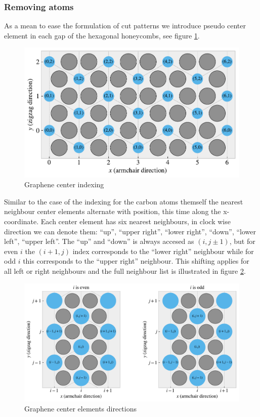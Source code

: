 \subsubsection{Removing atoms}

As a mean to ease the formulation of cut patterns we introduce pseudo center
element in each gap of the hexagonal honeycombs, see figure
\ref{fig:center_indexing}. 

\begin{figure}[H]
  \centering
  \includegraphics[width=0.7\linewidth]{figures/center_indexing.pdf}
  \caption{Graphene center indexing}
  \label{fig:center_indexing}
\end{figure}




Similar to the case of the indexing for the carbon atoms themself the nearest
neighbour center elements alternate with position, this time along the
x-coordinate. Each center element has six nearest neighbours, in clock wise
direction we can denote them: ``up'', ``upper right'', ``lower right'',
``down'', ``lower left'', ``upper left''. The ``up'' and ``down'' is always
accesed as $(i,j\pm 1)$, but for even $i$ the $(i+1,j)$ index corresponds to the
``lower right'' neighbour while for odd $i$ this corresponds to the ``upper
right'' neighbour. This shifting applies for all left or right neighbours and
the full neighbour list is illustrated in figure \ref{fig:center_directions}. 


\begin{figure}[H]
  \centering
  \includegraphics[width=0.7\linewidth]{figures/center_directions.pdf}
  \caption{Graphene center elements directions}
  \label{fig:center_directions}
\end{figure}


